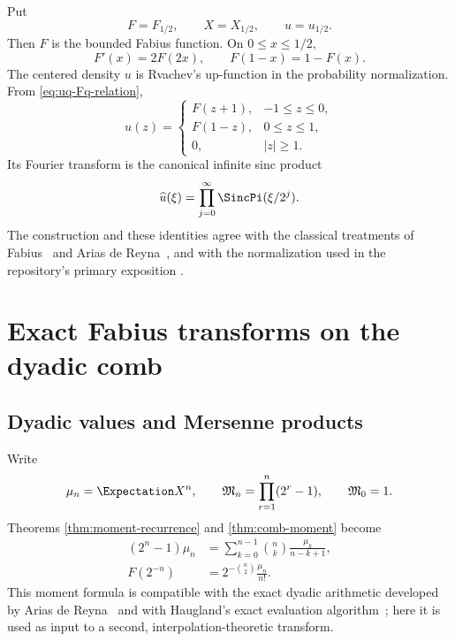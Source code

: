 \documentclass[11pt,a4paper,oneside]{article}
\theoremstyle{definition}
\theoremstyle{remark}
\begin{document}
Put
\[
 F=F_{1/2},\qquad X=X_{1/2},\qquad u=u_{1/2}.
\]
Then $F$ is the bounded Fabius function.  On $0\le x\le1/2$,
\[
 F'(x)=2F(2x),
 \qquad
 F(1-x)=1-F(x).
\]
The centered density $u$ is Rvachev's up-function in the probability
normalization.  From \eqref{eq:uq-Fq-relation},
\begin{equation}
 u(z)=
 \begin{cases}
 F(z+1),&-1\le z\le0,\\
 F(1-z),&0\le z\le1,\\
 0,&|z|\ge1.
 \end{cases}
 \label{eq:up-Fabius-piecewise}
\end{equation}
Its Fourier transform is the canonical infinite sinc product
\begin{equation}
 \widehat u(\xi)=\prod_{j=0}^\infty\SincPi(\xi/2^j).
 \label{eq:up-fourier-classical}
\end{equation}
The construction and these identities agree with the classical treatments of
Fabius~\cite{Fabius1966} and Arias de Reyna~\cite{Arias2017Definition}, and
with the normalization used in the repository's primary exposition
\cite{ProveItFabius}.

\section{Exact Fabius transforms on the dyadic comb}
\label{sec:fabius-transform}

\subsection{Dyadic values and Mersenne products}

Write
\begin{equation}
 \mu_n=\Expectation X^n,
 \qquad
 \mathfrak M_n=\prod_{r=1}^n(2^r-1),
 \qquad \mathfrak M_0=1.
 \label{eq:mersenne-definition}
\end{equation}
Theorems \ref{thm:moment-recurrence} and \ref{thm:comb-moment} become
\begin{align}
 (2^n-1)\mu_n
 &=\sum_{k=0}^{n-1}\binom nk\frac{\mu_k}{n-k+1},
 \label{eq:fabius-moment-recurrence}\\
 F(2^{-n})
 &=2^{-\binom n2}\frac{\mu_n}{n!}.
 \label{eq:fabius-value-moment}
\end{align}
This moment formula is compatible with the exact dyadic arithmetic developed
by Arias de Reyna~\cite{Arias2017Arithmetic} and with Haugland's exact
evaluation algorithm~\cite{Haugland2016}; here it is used as input to a
second, interpolation-theoretic transform.
\end{document}
